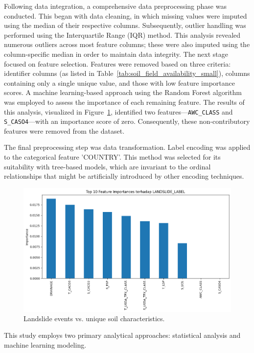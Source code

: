 Following data integration, a comprehensive data preprocessing phase was conducted. This began with data cleaning, in which missing values were imputed using the median of their respective columns. Subsequently, outlier handling was performed using the Interquartile Range (IQR) method. This analysis revealed numerous outliers across most feature columns; these were also imputed using the column-specific median in order to maintain data integrity.
The next stage focused on feature selection. Features were removed based on three criteria: identifier columns (as listed in Table~\ref{tab:soil_field_availability_small}), columns containing only a single unique value, and those with low feature importance scores. A machine learning-based approach using the Random Forest algorithm was employed to assess the importance of each remaining feature. The results of this analysis, visualized in Figure~\ref{fig:feature-importance}, identified two features—\texttt{AWC\_CLASS} and \texttt{S\_CASO4}—with an importance score of zero. Consequently, these non-contributory features were removed from the dataset.

The final preprocessing step was data transformation. Label encoding was applied to the categorical feature 'COUNTRY'. This method was selected for its suitability with tree-based models, which are invariant to the ordinal relationships that might be artificially introduced by other encoding techniques. 
\begin{figure}[htbp]
    \centerline{\includegraphics[width=\linewidth]{fig4.png}}
    \caption{Landslide events vs. unique soil characteristics.}
    \label{fig:feature-importance}
\end{figure}
This study employs two primary analytical approaches: statistical analysis and machine learning modeling.

